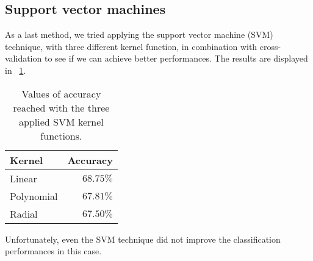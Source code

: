 \subsection{Support vector machines}

As a last method, we tried applying the support vector machine (SVM) technique, with three different kernel function, in combination with cross-validation to see if we can achieve better performances. The results are displayed in \Tab~\ref{table:SVMkernels}.

\begin{table}[H]
	\centering
	\begin{tabular}{|| l | r ||} 
		\hline
		Kernel & Accuracy \\
		\hline
		Linear & $68.75\%$ \\
		\hline
		Polynomial & $67.81\%$ \\
		\hline
		Radial & $67.50\%$ \\
		\hline
	\end{tabular}
	\caption{Values of accuracy reached with the three applied SVM kernel functions.}
	\label{table:SVMkernels}
\end{table} 

Unfortunately, even the SVM technique did not improve the classification performances in this case. 
